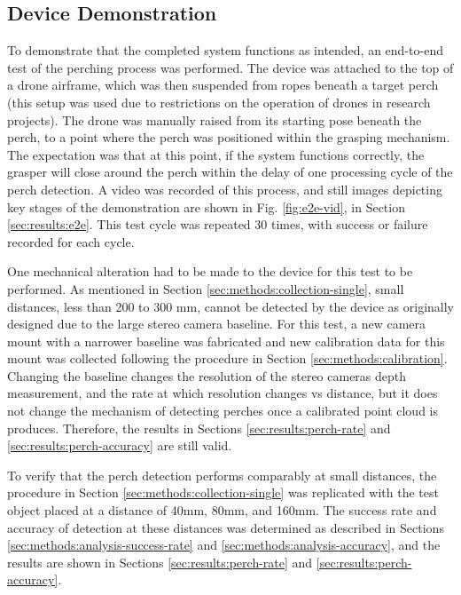 \subsection{Device Demonstration} \label{sec:methods:e2e}

To demonstrate that the completed system functions as intended, an end-to-end test of the perching process was performed.
The device was attached to the top of a drone airframe, which was then suspended from ropes beneath a target perch
(this setup was used due to restrictions on the operation of drones in research projects). The drone was manually raised from
its starting pose beneath the perch, to a point where the perch was positioned within the grasping mechanism. The expectation
was that at this point, if the system functions correctly, the grasper will close around the perch within the delay of one 
processing cycle of the perch detection. A video was recorded of this process, and still images depicting key stages
of the demonstration are shown in Fig. \ref{fig:e2e-vid}, in Section \ref{sec:results:e2e}. This test cycle was repeated 
30 times, with success or failure recorded for each cycle.

One mechanical alteration had to be made to the device for this test to be performed. As mentioned in Section \ref{sec:methods:collection-single},
small distances, less than 200 to 300 mm, cannot be detected by the device as originally designed due to the large stereo camera baseline.
For this test, a new camera mount with a narrower baseline was fabricated and new calibration data for this mount was collected following
the procedure in Section \ref{sec:methods:calibration}. Changing the baseline changes the resolution of the stereo cameras depth measurement,
and the rate at which resolution changes vs distance, but it does not change the mechanism of detecting perches once a calibrated point cloud is 
produces. Therefore, the results in Sections \ref{sec:results:perch-rate} and \ref{sec:results:perch-accuracy} are still valid. 

To verify that the perch detection performs comparably at small distances, the procedure in Section \ref{sec:methods:collection-single}
was replicated with the test object placed at a distance of 40mm, 80mm, and 160mm. The success rate and accuracy of detection at these distances
was determined as described in Sections \ref{sec:methods:analysis-success-rate} and \ref{sec:methods:analysis-accuracy}, and the results 
are shown in Sections \ref{sec:results:perch-rate} and \ref{sec:results:perch-accuracy}.
